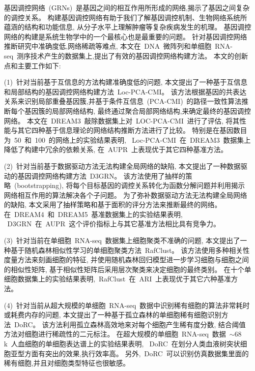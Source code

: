 \begin{abstractcn}\setlength{\baselineskip}{20pt}%
基因调控网络~(GRNs)~是基因之间的相互作用所形成的网络,揭示了基因之间复杂的调控关系。
构建基因调控网络有助于我们了解基因调控机制、生物网络系统所蕴涵的结构和功能信息,
从分子水平上理解肿瘤等复杂疾病发生的机理。
基因调控网络的构建是系统生物学中的一个最核心也是最重要的问题。
针对基因调控网络推断研究中准确度低,网络稀疏等难点, 
本文在~DNA~微阵列和单细胞~RNA-seq~测序技术产生的数据集上,提出了有效的基因调控网络构建方法。
本文的创新点和主要工作如下:

(1)~针对当前基于互信息的方法构建准确度低的问题,
本文提出了一种基于互信息和局部结构的基因调控网络构建方法~Loc-PCA-CMI。
该方法根据基因的共表达关系来识别局部重叠基因簇,并基于条件互信息~(PCA-CMI)~的路径一致性算法推断每个基因簇的局部网络结构,
最终通过聚合局部网络结构,来确定最终的基因调控网络。
本文在~DREAM3~敲除数据集上对~LOC-PCA-CMI~进行了评估,
将其性能与其它四种基于信息理论的网络结构推断方法进行了比较。
特别是在基因数目为~50~和~100~的网络上的实验结果表明,
~Loc-PCA-CMI~在~DREAM3~数据集上降低了构建中冗余的依赖关系,
在~AUPR~上表现优于其它四种基准方法。

(2)~针对当前基于数据驱动方法无法构建全局网络的缺陷,
本文提出了一种数据驱动的基因调控网络构建方法~D3GRN。
该方法使用了抽样的策略~(bootstrapping),
将每个目标基因的调控关系转化为函数分解问题并利用揭示网络相互作用的算法解决各个子问题。
为了弥补数据驱动方法无法构建全局网络的缺陷,
本文采用了抽样策略和基于面积的评分方法来推断最终的网络。
在~DREAM4~和~DREAM5~基准数据集上的实验结果表明,
~D3GRN~在~AUPR~这个评价指标上与其它基准方法相比具有竞争力。

(3)~针对当前在单细胞~RNA-seq~数据集上细胞聚类不准确的问题,
本文提出了一种基于随机森林相似性学习的单细胞聚类方法~RafClust。
该方法使用多种相关性度量方法来刻画细胞的特征, 
并使用随机森林回归模型进一步学习细胞与细胞之间的相似性矩阵,
基于相似性矩阵后采用层次聚类来决定细胞的最终类别。
在十个单细胞数据集上的实验结果表明,~RafClust~在~ARI~上表现优于其它六种基准方法。

(4)~针对当前从超大规模的单细胞~RNA-seq~数据中识别稀有细胞的算法非常耗时或耗费内存的问题,
本文提出了一种基于孤立森林的单细胞稀有细胞识别方法~DoRC。
该方法利用孤立森林高效地来对每个细胞产生稀有度分数,
结合阈值方法对细胞进行稀疏性的二元标注。
在超大规模的单细胞~RNA-seq~数据~${\sim}68$k~人血细胞的单细胞表达谱上的实验结果表明,
~DoRC~在划分人类血液树突状细胞亚型方面有突出的效果,执行效率高。
另外,~DoRC~可以识别仿真数据集里面的稀有细胞,并且对细胞类型特征也很敏感。


\end{abstractcn}
